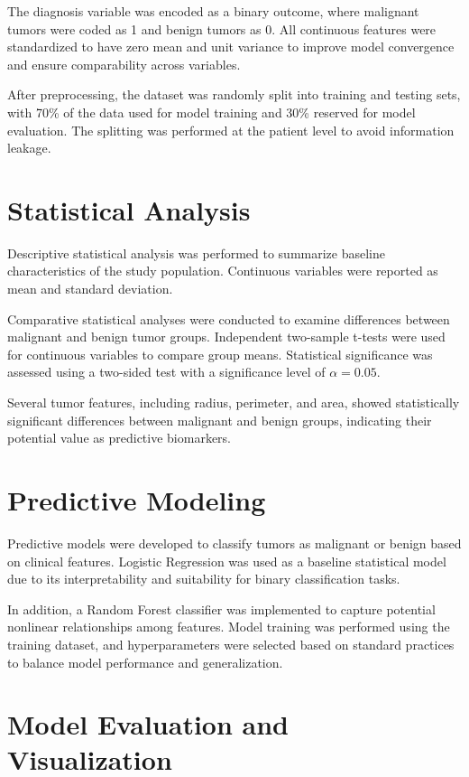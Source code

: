 \documentclass[12pt]{article}
\begin{document}
The diagnosis variable was encoded as a binary outcome, where malignant tumors were
coded as 1 and benign tumors as 0. All continuous features were standardized to have
zero mean and unit variance to improve model convergence and ensure comparability
across variables.

After preprocessing, the dataset was randomly split into training and testing sets,
with 70\% of the data used for model training and 30\% reserved for model evaluation.
The splitting was performed at the patient level to avoid information leakage.

\section{Statistical Analysis}

Descriptive statistical analysis was performed to summarize baseline characteristics
of the study population. Continuous variables were reported as mean and standard deviation.

Comparative statistical analyses were conducted to examine differences between malignant
and benign tumor groups. Independent two-sample t-tests were used for continuous variables
to compare group means. Statistical significance was assessed using a two-sided test
with a significance level of $\alpha = 0.05$.

Several tumor features, including radius, perimeter, and area, showed statistically
significant differences between malignant and benign groups, indicating their potential
value as predictive biomarkers.

\section{Predictive Modeling}

Predictive models were developed to classify tumors as malignant or benign based on
clinical features. Logistic Regression was used as a baseline statistical model due to
its interpretability and suitability for binary classification tasks.

In addition, a Random Forest classifier was implemented to capture potential nonlinear
relationships among features. Model training was performed using the training dataset,
and hyperparameters were selected based on standard practices to balance model performance
and generalization.

\section{Model Evaluation and Visualization}
\end{document}
